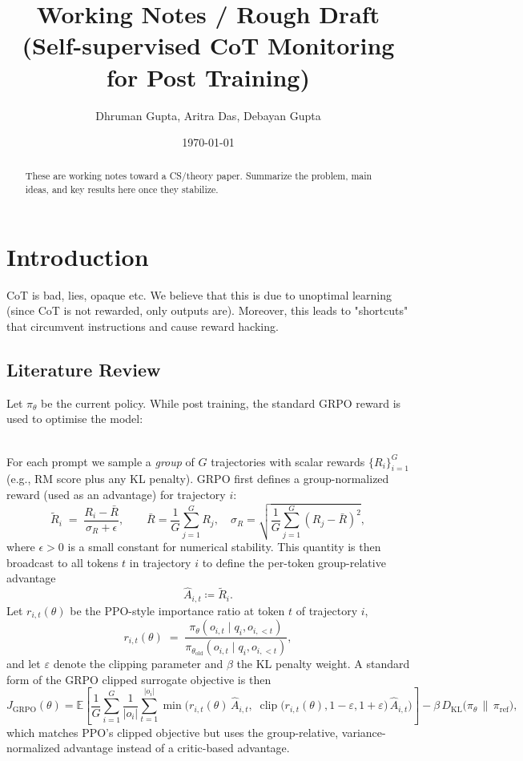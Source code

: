 \documentclass[11pt]{article}
\title{Working Notes / Rough Draft\\[4pt]\large (Self-supervised CoT Monitoring for Post Training)}
\author{Dhruman Gupta, Aritra Das, Debayan Gupta}
\date{\today}
\theoremstyle{plain}
\theoremstyle{definition}
\theoremstyle{remark}
\newcommand{\1}{\mathbf{1}}
\begin{document}
\maketitle

\begin{abstract}
These are working notes toward a CS/theory paper. Summarize the problem, main ideas, and key results here once they stabilize.
\end{abstract}

\tableofcontents
\newpage


\section{Introduction}


CoT is bad, lies, opaque etc. We believe that this is due to unoptimal learning (since CoT is not rewarded, only outputs are). Moreover, this leads to "shortcuts" that circumvent instructions and cause reward hacking.

\subsection{Literature Review}

Let $\pi_\theta$ be the current policy. While post training, the standard GRPO reward is used to optimise the model:

\\
For each prompt we sample a \emph{group} of $G$ trajectories with scalar rewards $\{R_i\}_{i=1}^G$ (e.g., RM score plus any KL penalty). GRPO first defines a group-normalized reward (used as an advantage) for trajectory $i$:
$$
\tilde R_i \;=\; \frac{R_i - \bar R}{\sigma_R + \epsilon}, \qquad
\bar R = \frac{1}{G}\sum_{j=1}^G R_j,\quad
\sigma_R = \sqrt{\frac{1}{G}\sum_{j=1}^G (R_j - \bar R)^2},
$$
where $\epsilon > 0$ is a small constant for numerical stability. This quantity is then broadcast to all tokens $t$ in trajectory $i$ to define the per-token group-relative advantage
$$
\hat A_{i,t} \coloneqq \tilde R_i.
$$
Let $r_{i,t}(\theta)$ be the PPO-style importance ratio at token $t$ of trajectory $i$,
$$
r_{i,t}(\theta) \;=\; \frac{\pi_\theta(o_{i,t} \mid q_i, o_{i,<t})}{\pi_{\theta_{\mathrm{old}}}(o_{i,t} \mid q_i, o_{i,<t})},
$$
and let $\varepsilon$ denote the clipping parameter and $\beta$ the KL penalty weight. A standard form of the GRPO clipped surrogate objective is then
$$
J_{\mathrm{GRPO}}(\theta)
= \mathbb{E}\!\left[
\frac{1}{G}\sum_{i=1}^G \frac{1}{|o_i|}\sum_{t=1}^{|o_i|}
\min\!\Big(
r_{i,t}(\theta)\,\hat A_{i,t},\;
\operatorname{clip}\!\big(r_{i,t}(\theta), 1-\varepsilon, 1+\varepsilon\big)\,\hat A_{i,t}
\Big)
\right]
- \beta\,D_{\mathrm{KL}}\!\big(\pi_\theta \,\|\, \pi_{\mathrm{ref}}\big),
$$
which matches PPO's clipped objective but uses the group-relative, variance-normalized advantage instead of a critic-based advantage.\\
\end{document}
